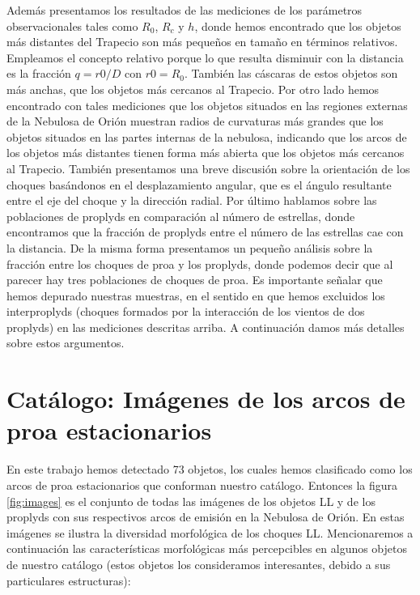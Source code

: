 Además presentamos los resultados de las mediciones de los parámetros observacionales tales como \(R_{0}\), \(R_{c}\) y \(h\), donde hemos encontrado que los objetos más distantes del Trapecio son más pequeños en tamaño en términos relativos. Empleamos el concepto relativo porque lo que resulta disminuir con la distancia es la  fracción \(q=r0/D\) con \(r0=R_{0}\). También las cáscaras de estos objetos son más anchas, que los objetos más cercanos al Trapecio. Por otro lado hemos encontrado con tales mediciones que los objetos situados en las regiones externas de la Nebulosa de Orión muestran radios de curvaturas más grandes que los objetos situados en las partes internas de la nebulosa, indicando  que los arcos de los objetos más distantes tienen forma más abierta que los objetos más cercanos al Trapecio. También presentamos una breve discusión sobre la orientación de los choques basándonos en el desplazamiento angular, que es el ángulo resultante entre el eje del choque  y la dirección radial. Por último hablamos sobre las poblaciones de proplyds en comparación al número de estrellas, donde encontramos que la fracción de proplyds entre el número de las estrellas cae con la distancia.  De la misma forma presentamos un pequeño análisis sobre la fracción entre los choques de proa y los proplyds, donde podemos decir que al parecer hay tres poblaciones de choques de proa. Es importante señalar que hemos depurado nuestras muestras, en el sentido en que hemos excluidos los interproplyds (choques formados por la interacción de los vientos de dos proplyds) en las mediciones descritas arriba. A continuación damos más detalles sobre estos argumentos.    

\section{Catálogo: Imágenes de los arcos de proa estacionarios}
\label{sec:images}

En este trabajo hemos detectado 73 objetos, los cuales hemos clasificado como los arcos de proa estacionarios que conforman nuestro catálogo. Entonces la figura \ref{fig:images} es el conjunto de todas las imágenes de los objetos LL y de los proplyds con sus respectivos arcos de emisión en la Nebulosa de Orión. En estas imágenes se ilustra la diversidad morfológica de los choques LL. Mencionaremos a continuación las características morfológicas más percepcibles en algunos objetos de nuestro catálogo (estos objetos los consideramos interesantes, debido a sus particulares estructuras):\\


